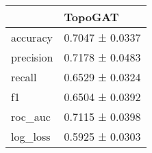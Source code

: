 \begin{tabular}{ll}
\toprule
 & TopoGAT \\
\midrule
accuracy & 0.7047 ± 0.0337 \\
precision & 0.7178 ± 0.0483 \\
recall & 0.6529 ± 0.0324 \\
f1 & 0.6504 ± 0.0392 \\
roc_auc & 0.7115 ± 0.0398 \\
log_loss & 0.5925 ± 0.0303 \\
\bottomrule
\end{tabular}

